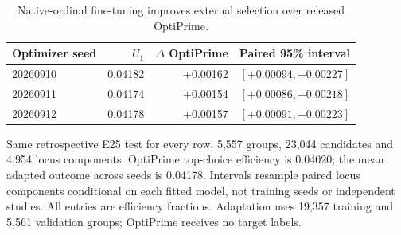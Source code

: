 \begin{table}[htbp]
\centering\small
\caption{Native-ordinal fine-tuning improves external selection over released OptiPrime.}
\label{tab:ordinalselection}
\begin{tabular}{lrrr}
\toprule
Optimizer seed & \model{} $U_1$ & $\Delta$ OptiPrime & Paired 95\% interval \\
\midrule
20260910 & 0.04182 & +0.00162 & $[+0.00094, +0.00227]$ \\
20260911 & 0.04174 & +0.00154 & $[+0.00086, +0.00218]$ \\
20260912 & 0.04178 & +0.00157 & $[+0.00091, +0.00223]$ \\
\bottomrule
\end{tabular}
\par\smallskip
\begin{minipage}{\linewidth}\footnotesize Same retrospective E25 test for every row: 5,557 groups, 23,044 candidates and 4,954 locus components. OptiPrime top-choice efficiency is 0.04020; the mean adapted outcome across seeds is 0.04178. Intervals resample paired locus components conditional on each fitted model, not training seeds or independent studies. All entries are efficiency fractions. Adaptation uses 19,357 training and 5,561 validation groups; OptiPrime receives no target labels.\end{minipage}
\end{table}
